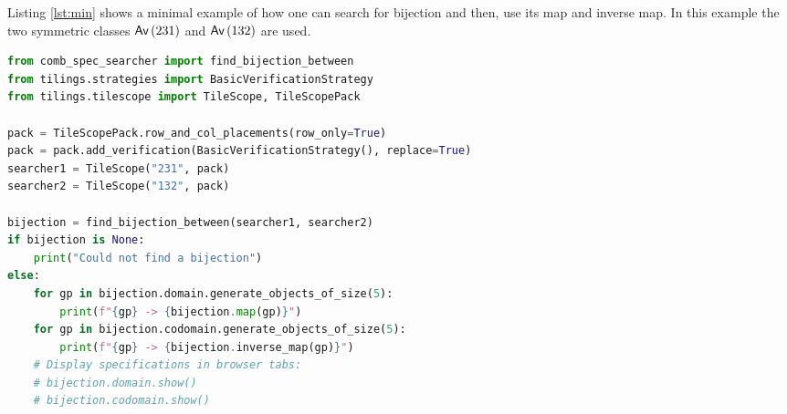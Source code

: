 \label{ch:minex}
Listing \ref{lst:min} shows a minimal example of how one can search for bijection and then, use its map and inverse map. In this example the two symmetric classes $\textsf{Av}\left(231\right)$ and $\textsf{Av}\left(132\right)$ are used.

\begin{lstlisting}[style=py,language=Python,caption={A minimal example to find a bijection.},label={lst:min}]
from comb_spec_searcher import find_bijection_between
from tilings.strategies import BasicVerificationStrategy
from tilings.tilescope import TileScope, TileScopePack

pack = TileScopePack.row_and_col_placements(row_only=True)
pack = pack.add_verification(BasicVerificationStrategy(), replace=True)
searcher1 = TileScope("231", pack)
searcher2 = TileScope("132", pack)

bijection = find_bijection_between(searcher1, searcher2)
if bijection is None:
    print("Could not find a bijection")
else:
    for gp in bijection.domain.generate_objects_of_size(5):
        print(f"{gp} -> {bijection.map(gp)}")
    for gp in bijection.codomain.generate_objects_of_size(5):
        print(f"{gp} -> {bijection.inverse_map(gp)}")
    # Display specifications in browser tabs:
    # bijection.domain.show()
    # bijection.codomain.show()
\end{lstlisting}

